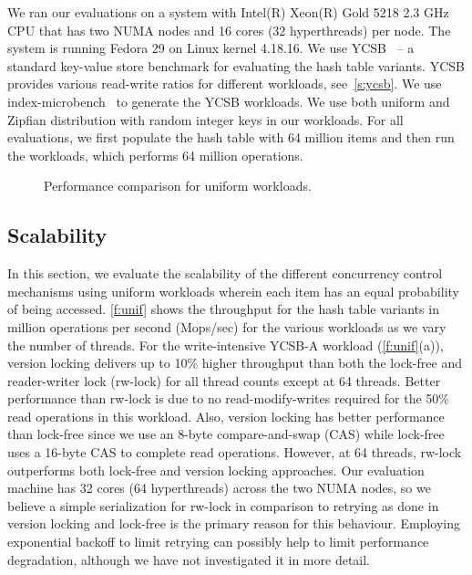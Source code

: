 We ran our evaluations on a system with Intel(R) Xeon(R) Gold 5218 2.3 GHz CPU that has
two NUMA nodes and 16 cores (32 hyperthreads) per node. The system is running Fedora 29
on Linux kernel 4.18.16. We use YCSB~\cite{ycsb-cooper-socc10} -- a standard key-value
store benchmark for evaluating the hash table variants. YCSB provides various read-write
ratios for different workloads, see~\autoref{s:ycsb}. We use
index-microbench~\cite{indexbench-Wang-sigmod18} to generate the YCSB workloads.
We use both uniform and Zipfian distribution with random integer keys in our
workloads. For all evaluations, we first populate the hash table with 64 million
items and then run the workloads, which performs 64 million operations.

\begin{figure}[t]
    \centering
    
    \vspace{-20pt}
    \caption{Performance comparison for uniform workloads.}
    \label{f:unif}
    \vspace{-2pt}
\end{figure}

\subsection{Scalability}
\label{s:eval:scale}
In this section, we evaluate the scalability of the different concurrency control
mechanisms using uniform workloads wherein each item has an equal probability of
being accessed. \autoref{f:unif} shows the throughput for the hash table variants in 
million operations per second (Mops/sec) for the various workloads as we vary
the number of threads. For the write-intensive YCSB-A workload (\autoref{f:unif}(a)),
version locking delivers up to 10\% higher throughput than both the lock-free and
reader-writer lock (rw-lock) for all thread counts except at 64 threads. Better
performance than rw-lock is due to no read-modify-writes required for the 50\% read
operations in this workload. Also, version locking has better performance than lock-free
since we use an 8-byte compare-and-swap (CAS) while lock-free uses a 16-byte CAS to
complete read operations. However, at 64 threads, rw-lock outperforms both lock-free and
version locking approaches. Our evaluation machine has 32 cores (64 hyperthreads) across
the two NUMA nodes, so we believe a simple serialization for rw-lock in comparison to
retrying as done in version locking and lock-free is the primary reason for this behaviour.
Employing exponential backoff to limit retrying can possibly help to limit performance
degradation, although we have not investigated it in more detail.

